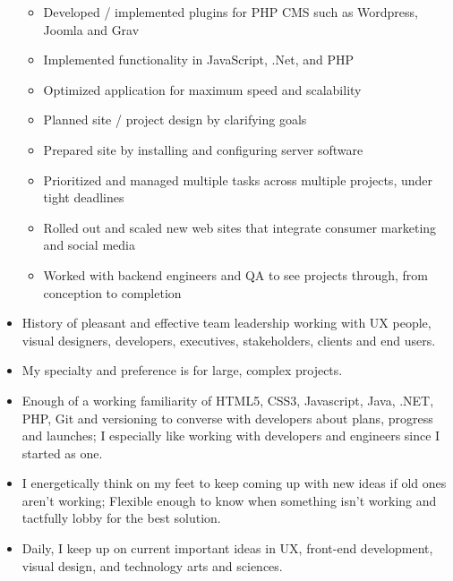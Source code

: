 \documentclass{resume}
\begin{document}
\begin{itemize}
\begin{itemize}
      \item Developed / implemented plugins for PHP CMS such as Wordpress, Joomla and Grav
      \item Implemented functionality in JavaScript, .Net, and PHP
      \item Optimized application for maximum speed and scalability
      \item Planned site / project design by clarifying goals
      \item Prepared site by installing and configuring server software
      \item Prioritized and managed multiple tasks across multiple projects, under tight deadlines
      \item Rolled out and scaled new web sites that integrate consumer marketing and social media
      \item Worked with backend engineers and QA to see projects through, from conception to completion
    \end{itemize}
    \item History of pleasant and effective team leadership working with UX people, visual designers, developers, executives, stakeholders, clients and end users.
    \item My specialty and preference is for large, complex projects.
    \item Enough of a working familiarity of HTML5, CSS3, Javascript, Java, .NET, PHP, Git and versioning to converse with developers about plans, progress and launches; I especially like working with developers and engineers since I started as one.
    \item I energetically think on my feet to keep coming up with new ideas if old ones aren’t working; Flexible enough to know when something isn’t working and tactfully lobby for the best solution.
    \item Daily, I keep up on current important ideas in UX, front-end development, visual design, and technology arts and sciences.
  \end{itemize}
\end{document}

